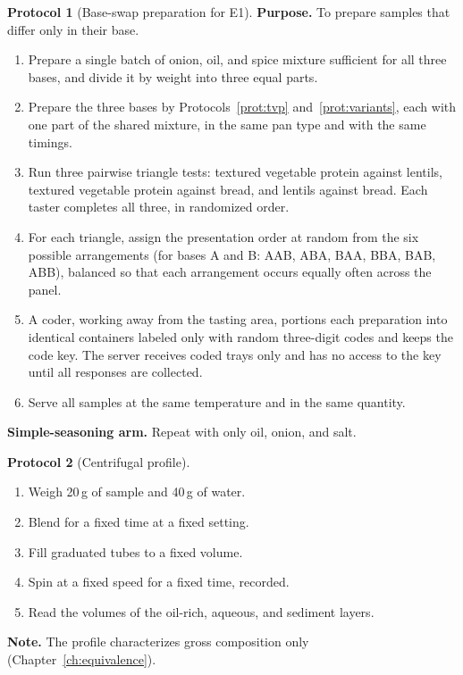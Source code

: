 \documentclass[11pt,openany]{book}
\theoremstyle{definition}
\newtheorem{protocol}{Protocol}[chapter]
\begin{document}
\begin{protocol}[Base-swap preparation for E1]\label{prot:e1}
\textbf{Purpose.} To prepare samples that differ only in their base.
\begin{enumerate}
\item Prepare a single batch of onion, oil, and spice mixture sufficient for all three bases, and divide it by weight into three equal parts.
\item Prepare the three bases by Protocols~\ref{prot:tvp} and~\ref{prot:variants}, each with one part of the shared mixture, in the same pan type and with the same timings.
\item Run three pairwise triangle tests: textured vegetable protein against lentils, textured vegetable protein against bread, and lentils against bread. Each taster completes all three, in randomized order.
\item For each triangle, assign the presentation order at random from the six possible arrangements (for bases A and B: AAB, ABA, BAA, BBA, BAB, ABB), balanced so that each arrangement occurs equally often across the panel.
\item A coder, working away from the tasting area, portions each preparation into identical containers labeled only with random three-digit codes and keeps the code key. The server receives coded trays only and has no access to the key until all responses are collected.
\item Serve all samples at the same temperature and in the same quantity.
\end{enumerate}
\textbf{Simple-seasoning arm.} Repeat with only oil, onion, and salt.
\end{protocol}

\begin{protocol}[Centrifugal profile]\label{prot:centrifuge}
\begin{enumerate}
\item Weigh 20\,g of sample and 40\,g of water.
\item Blend for a fixed time at a fixed setting.
\item Fill graduated tubes to a fixed volume.
\item Spin at a fixed speed for a fixed time, recorded.
\item Read the volumes of the oil-rich, aqueous, and sediment layers.
\end{enumerate}
\textbf{Note.} The profile characterizes gross composition only (Chapter~\ref{ch:equivalence}).
\end{protocol}
\end{document}
